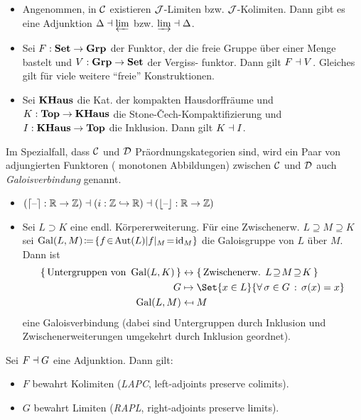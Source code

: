 \documentclass{cheat-sheet}
\DeclareMathOperator{\Gal}{Gal} %
\newcommand{\ceil}[1]{\lceil #1 \rceil} %
\newcommand{\floor}[1]{\lfloor #1 \rfloor} %
\begin{document}
\begin{bspe}
  \begin{itemize}
    \item Angenommen, in $\mathcal{C}$ existieren $\mathcal{J}$-Limiten bzw. $\mathcal{J}$-Kolimiten. Dann gibt es eine Adjunktion
    $\Delta \dashv \varprojlim$
    bzw.
    $\varinjlim \dashv \Delta$.
    \item Sei $F : \mathbf{Set} \to \mathbf{Grp}$ der Funktor, der die freie Gruppe über einer Menge bastelt und $V : \mathbf{Grp} \to \mathbf{Set}$ der Vergiss- funktor. Dann gilt $F \dashv V$. Gleiches gilt für viele weitere "`freie"' Konstruktionen.
    \item Sei $\mathbf{KHaus}$ die Kat. der kompakten Hausdorffräume und $K : \mathbf{Top} \to \mathbf{KHaus}$ die Stone-Čech-Kompaktifizierung und $I : \mathbf{KHaus} \to \mathbf{Top}$ die Inklusion. Dann gilt $K \dashv I$.
  \end{itemize}
\end{bspe}

\begin{defn}
  Im Spezialfall, dass $\mathcal{C}$ und $\mathcal{D}$ Präordnungskategorien sind, wird ein Paar von adjungierten Funktoren (\dh{} monotonen Abbildungen) zwischen $\mathcal{C}$ und $\mathcal{D}$ auch \emph{Galoisverbindung} genannt.
\end{defn}

\begin{bspe}
  \begin{itemize}
    \item $(\ceil{\blank} : \R \to \Z) \ladj (i : \Z \hookrightarrow \R) \ladj (\floor{\blank} : \R \to \Z)$
    \item Sei $L \supset K$ eine endl. Körpererweiterung.
    Für eine Zwischenerw. $L \!\supseteq\! M \!\supseteq\! K$ sei
    $\Gal(L, M) \!\coloneqq\! \{ f \!\in\! \Aut(L) | f|_M \!=\! \id_M \}$ die Galoisgruppe von $L$ über $M$.
    Dann ist
    \begin{align*}
      \{ \, \text{Untergruppen von } \Gal(L, K) \, \} & \leftrightarrow \{ \, \text{Zwischenerw. } L \!\supseteq\! M \!\supseteq\! K \, \} \\
      G & \mapsto \Set{x \in L}{\fa{\sigma \in G} \sigma(x) = x} \\
      \Gal(L, M) & \mapsfrom M
    \end{align*}
    eine Galoisverbindung (dabei sind Untergruppen durch Inklusion und Zwischenerweiterungen umgekehrt durch Inklusion geordnet).
  \end{itemize}
\end{bspe}

\begin{lem}
  Sei $F \dashv G$ eine Adjunktion. Dann gilt:
  \begin{itemize}
    \item $F$ bewahrt Kolimiten (\emph{LAPC}, left-adjoints preserve colimits).
    \item $G$ bewahrt Limiten (\emph{RAPL}, right-adjoints preserve limits).
  \end{itemize}
\end{lem}
\end{document}
